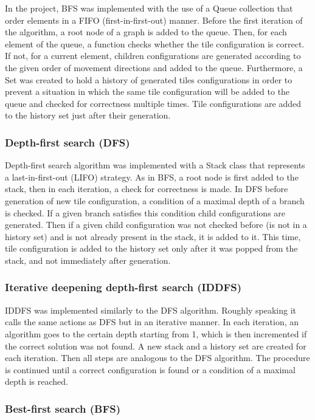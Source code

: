 \documentclass[12pt]{article}
\begin{document}
In the project, BFS was implemented with the use of a Queue collection that order elements in a FIFO (first-in-first-out) manner. Before the first iteration of the algorithm, a root node of a graph is added to the queue. Then, for each element of the queue, a function checks whether the tile configuration is correct. If not, for a current element, children configurations are generated according to the given order of movement directions and added to the queue. Furthermore, a Set was created to hold a history of generated tiles configurations in order to prevent a situation in which the same tile configuration will be added to the queue and checked for correctness multiple times. Tile configurations are added to the history set just after their generation.

\subsubsection{Depth-first search (DFS)}

Depth-first search algorithm was implemented with a Stack class that represents a last-in-first-out (LIFO) strategy. As in BFS, a root node is first added to the stack, then in each iteration, a check for correctness is made. In DFS before generation of new tile configuration, a condition of a maximal depth of a branch is checked. If a given branch satisfies this condition child configurations are generated. Then if a given child configuration was not checked before (is not in a history set) and is not already present in the stack, it is added to it. This time, tile configuration is added to the history set only after it was popped from the stack, and not immediately after generation.

\subsubsection{Iterative deepening depth-first search (IDDFS)}

IDDFS was implemented similarly to the DFS algorithm. Roughly speaking it calls the same actions as DFS but in an iterative manner. In each iteration, an algorithm goes to the certain depth starting from 1, which is then incremented if the correct solution was not found. A new stack and a history set are created for each iteration. Then all steps are analogous to the DFS algorithm. The procedure is continued until a correct configuration is found or a condition of a maximal depth is reached.

 \subsubsection{Best-first search (BFS)}
\end{document}
